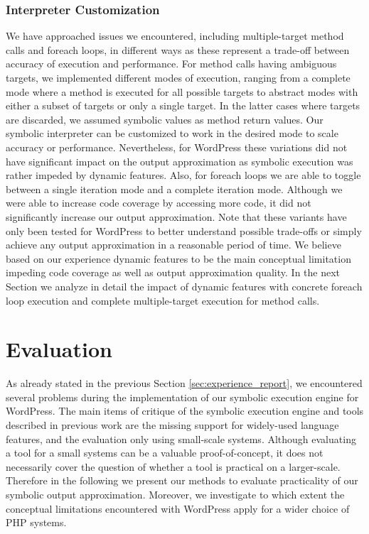 \documentclass[sigconf]{acmart}
\renewcommand{\sf}[1]{\textsf{#1}}
\begin{document}
\subsubsection{Interpreter Customization}
We have approached issues we encountered, including
multiple-target method calls and foreach loops, in different ways as these
represent a trade-off between accuracy of execution and performance.
For method calls having ambiguous targets, we implemented different modes of
execution, ranging from a complete mode where a method is executed for all
possible targets to abstract modes with either a subset of targets or only a
single target. In the latter cases where targets are discarded, we assumed
symbolic values as method return values. Our symbolic interpreter can be
customized to work in the desired mode to scale accuracy or performance.
Nevertheless, for \sf{WordPress} these variations did not have significant
impact on the output approximation as symbolic execution was rather impeded by
dynamic features.
Also, for foreach loops we are able to toggle between a single iteration mode
and a complete iteration mode. Although we were able to increase code coverage
by accessing more code, it did not significantly increase our output
approximation.
Note that these variants have only been tested for \sf{WordPress} to better
understand possible trade-offs or simply achieve any output approximation in a
reasonable period of time. We believe based on our experience dynamic features
to be the main conceptual limitation impeding code coverage as well as output
approximation quality. In the next Section we analyze in detail the impact of
dynamic features with concrete foreach loop execution and complete
multiple-target execution for method calls.

\section{Evaluation}
As already stated in the previous Section \ref{sec:experience_report}, we
encountered several problems during the implementation of our symbolic
execution engine for \sf{WordPress}. The main items of critique of the symbolic
execution engine and tools described in previous work
\cite{Nguyen:2011:AFH:2190078.2190142,Nguyen:2014:BCG:2635868.2635928,Nguyen:2015:CPS:2786805.2786872,Nguyen:2015:VIS:2819009.2819140}
are the missing support for widely-used language features, and the evaluation
only using small-scale systems. Although evaluating a tool for a small systems
can be a valuable proof-of-concept, it does not necessarily cover the question
of whether a tool is practical on a larger-scale. Therefore in the following we
present our methods to evaluate practicality of our symbolic output
approximation. Moreover, we investigate to which extent the conceptual limitations encountered
with \sf{WordPress} apply for a wider choice of PHP systems.
\end{document}
